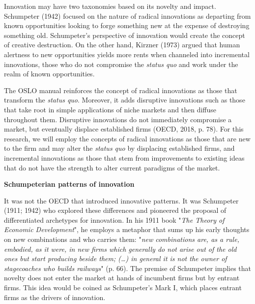 \documentclass[12pt,a4paper]{article}
\begin{document}
Innovation may have two taxonomies based on its novelty and impact. Schumpeter (1942) focused on the nature of radical innovations as departing from known opportunities looking to forge something new at the expense of destroying something old. Schumpeter's perspective of innovation would create the concept of creative destruction. On the other hand, Kirzner (1973) argued that human alertness to new opportunities yields more rents when channeled into incremental innovations, those who do not compromise the \textit{status quo} and work under the realm of known opportunities. 

The OSLO manual reinforces the concept of radical innovations as those that transform the \textit{status quo}. Moreover, it adds disruptive innovations such as those that take root in simple applications of niche markets and then diffuse throughout them. Disruptive innovations do not immediately compromise a market, but eventually displace established firms (OECD, 2018, p. 78). For this research, we will employ the concepts of radical innovations as those that are new to the firm and may alter the \textit{status quo} by displacing established firms, and incremental innovations as those that stem from improvements to existing ideas that do not have the strength to alter current paradigms of the market.

\pagebreak

\noindent \textbf{Schumpeterian patterns of innovation }

It was not the OECD that introduced innovative patterns. It was Schumpeter (1911; 1942) who explored these differences and pioneered the proposal of differentiated archetypes for innovation. In his 1911 book "\textit{The Theory of Economic Development}", he employs a metaphor that sums up his early thoughts on new combinations and who carries them: "\textit{new combinations are, as a rule, embodied, as it were, in new firms which generally do not arise out of the old ones but start producing beside them; (…) in general it is not the owner of stagecoaches who builds railways}" (p. 66). The premise of Schumpeter implies that novelty does not enter the market at hands of incumbent firms but by entrant firms. This idea would be coined as Schumpeter's Mark I, which places entrant firms as the drivers of innovation.
\end{document}

